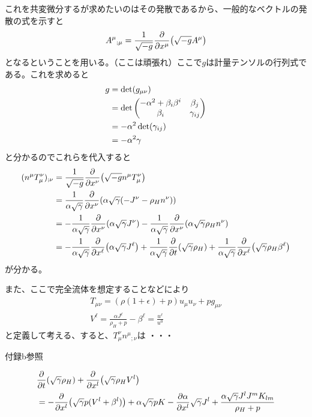 \documentclass[autodetect-engine,dvi=dvipdfmx,ja=standard, 10pt, a4paper]{bxjsarticle}
\begin{document}
これを共変微分するが求めたいのはその発散であるから、一般的なベクトルの発散の式を示すと
\begin{align}
	A^\mu{}_{;\mu} = \frac{1}{\sqrt{-g}}\pdv{x^\mu}\qty(\sqrt{-g}A^\mu)
\end{align}
となるということを用いる。（ここは頑張れ）ここで$g$は計量テンソルの行列式である。これを求めると
\begin{align}
	g &= \det(g_{\mu\nu}) \nonumber\\
	&= \det\pmqty{ -\alpha^2 + \beta_i\beta^i & \beta_j\\ \beta_i & \gamma_{ij} } \nonumber\\
	&= -\alpha^2 \det(\gamma_{ij}) \nonumber\\
	&= -\alpha^2 \gamma
\end{align}
と分かるのでこれらを代入すると
\begin{align}
	(n^\mu T_{\mu}^{\nu})_{;\nu} &= \frac{1}{\sqrt{-g}}\pdv{x^\nu}\qty(\sqrt{-g}n^\mu T_{\mu}^{\nu})\nonumber\\
	&= \frac{1}{\alpha\sqrt{\gamma}}\pdv{x^\nu}\qty(\alpha\sqrt{\gamma}(- J^{\nu} -\rho_H n^{\nu}))\nonumber\\
	&= -\frac{1}{\alpha\sqrt{\gamma}}\pdv{x^\nu}\qty(\alpha\sqrt{\gamma} J^{\nu}) - \frac{1}{\alpha\sqrt{\gamma}}\pdv{x^\nu}\qty(\alpha\sqrt{\gamma}\rho_H n^{\nu})\nonumber\\
	&= -\frac{1}{\alpha\sqrt{\gamma}}\pdv{x^\ell}\qty(\alpha\sqrt{\gamma} J^{\ell}) + \frac{1}{\alpha\sqrt{\gamma}}\pdv{t}\qty(\sqrt{\gamma}\rho_H) + \frac{1}{\alpha\sqrt{\gamma}}\pdv{x^\ell}\qty(\sqrt{\gamma}\rho_H \beta^\ell)
\end{align}
が分かる。

また、ここで完全流体を想定することなどにより
\begin{align}
	T_{\mu\nu} = (\rho(1+\epsilon) + p)u_\mu u_\nu + p g_{\mu\nu}\\
	V^{\ell} = \frac{\alpha J^{\ell}}{\rho_H + p} - \beta^{\ell} = \frac{u^{\ell}}{u^0}
\end{align}
と定義して考える、すると、$T_{\mu}^{\nu} n^\mu{}_{;\nu}$は
・・・

付録b参照

\begin{align}
	&\pdv{t}\qty(\sqrt{\gamma}\rho_H) + \pdv{x^l}\qty(\sqrt{\gamma}\rho_H V^l)\nonumber\\
	&=-\pdv{x^l}\qty(\sqrt{\gamma}p(V^l+\beta^l)) +\alpha\sqrt{\gamma}pK - \pdv{\alpha}{x^l}\sqrt{\gamma}J^l+\frac{\alpha\sqrt{\gamma}J^lJ^m K_{lm}}{\rho_H + p}
\end{align}
\end{document}
